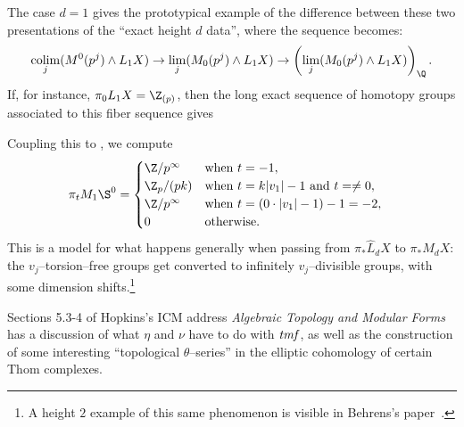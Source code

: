 \begin{remark}
The case $d = 1$ gives the prototypical example of the difference between these two presentations of the ``exact height $d$ data'', where the sequence becomes: \[\colim_j (M^0(p^j) \sm L_1 X) \to \lim_j (M_0(p^j) \sm L_1 X) \to \left( \lim_j (M_0(p^j) \sm L_1 X) \right)_{\Q}.\]  If, for instance, $\pi_0 L_1 X = \Z_{(p)}$, then the long exact sequence of homotopy groups associated to this fiber sequence gives
\begin{center}
\end{center}
Coupling this to , we compute
\begin{align*}
\pi_t M_1 \S^0 & = \begin{cases} \Z/p^\infty & \text{when $t = -1$}, \\ \Z_p / (pk) & \text{when $t = k|v_1| - 1$ and $t = \ne 0$}, \\ \Z/p^\infty & \text{when $t = (0 \cdot |v_1| - 1) - 1 = -2$}, \\ 0 & \text{otherwise}. \end{cases}
\end{align*}
This is a model for what happens generally when passing from $\pi_* \widehat L_d X$ to $\pi_* M_d X$: the $v_j$--torsion--free groups get converted to infinitely $v_j$--divisible groups, with some dimension shifts.\footnote{A height $2$ example of this same phenomenon is visible in Behrens's paper~\cite[Section 7]{BehrensRevisited}.}
\end{remark}



Sections 5.3-4 of Hopkins's ICM address \textit{Algebraic Topology and Modular Forms} has a discussion of what $\eta$ and $\nu$ have to do with $\mathit{tmf}$, as well as the construction of some interesting ``topological $\theta$--series'' in the elliptic cohomology of certain Thom complexes.






